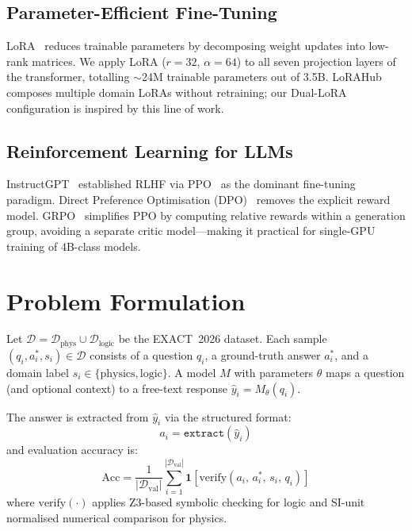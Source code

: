 \documentclass{ieeeaccess}
\newcommand{\dataset}{EXACT~2026}
\begin{document}
\subsection{Parameter-Efficient Fine-Tuning}

LoRA~\cite{Hu2022} reduces trainable parameters by decomposing weight updates
into low-rank matrices.
We apply LoRA ($r=32$, $\alpha=64$) to all seven projection layers of the
transformer, totalling $\sim$24M trainable parameters out of 3.5B.
LoRAHub~\cite{Huang2023} composes multiple domain LoRAs without retraining;
our Dual-LoRA configuration is inspired by this line of work.

\subsection{Reinforcement Learning for LLMs}

InstructGPT~\cite{Ouyang2022} established RLHF via PPO~\cite{Schulman2017}
as the dominant fine-tuning paradigm.
Direct Preference Optimisation (DPO)~\cite{Rafailov2023} removes the
explicit reward model.
GRPO~\cite{Shao2024} simplifies PPO by computing relative rewards within
a generation group, avoiding a separate critic model—making it practical
for single-GPU training of 4B-class models.

\section{Problem Formulation}
\label{sec:problem}

Let $\mathcal{D} = \mathcal{D}_{\text{phys}} \cup \mathcal{D}_{\text{logic}}$
be the \dataset{} dataset.
Each sample $(q_i, a_i^*, s_i) \in \mathcal{D}$ consists of a question
$q_i$, a ground-truth answer $a_i^*$, and a domain label
$s_i \in \{\text{physics}, \text{logic}\}$.
A model $M$ with parameters $\theta$ maps a question (and optional context) to
a free-text response $\hat{y}_i = M_\theta(q_i)$.

The answer is extracted from $\hat{y}_i$ via the structured format:
\begin{equation}
  a_i = \texttt{extract}(\hat{y}_i)
\end{equation}
and evaluation accuracy is:
\begin{equation}
  \mathrm{Acc} = \frac{1}{|\mathcal{D}_\text{val}|}
  \sum_{i=1}^{|\mathcal{D}_\text{val}|} \mathbf{1}\!\left[
    \mathrm{verify}(a_i,\, a_i^*,\, s_i,\, q_i)
  \right]
\end{equation}
where $\mathrm{verify}(\cdot)$ applies Z3-based symbolic checking for logic
and SI-unit normalised numerical comparison for physics.
\end{document}
